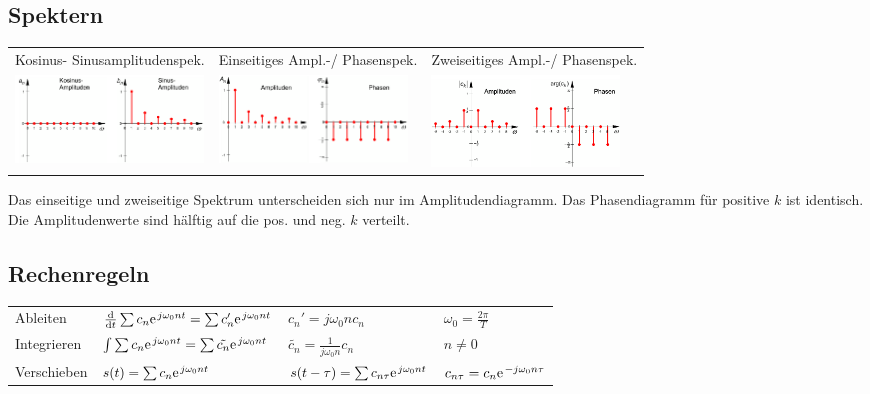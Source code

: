      	
\subsection{Spektern}

\begin{tabular}{p{}p{}p{}}
	Kosinus- Sinusamplitudenspek. & 
	Einseitiges Ampl.-/ Phasenspek. &
	Zweiseitiges Ampl.-/ Phasenspek. \\
	\includegraphics[width=5cm]{content/appendix/cosSinSpectr.png} &
	\includegraphics[width=5cm]{content/appendix/EinseitigSpectr.png} &
	\includegraphics[width=5cm]{content/appendix/ZweiseitigSpectr.png}
\end{tabular}

Das einseitige und zweiseitige Spektrum unterscheiden sich nur im
Amplitudendiagramm. Das Phasendiagramm für positive $k$ ist identisch. Die
Amplitudenwerte sind hälftig auf die pos. und neg. $k$ verteilt.

\subsection{Rechenregeln}
\begin{tabular}{p{}p{}p{}p{}}
  Ableiten & $\frac{\text{d}}{\text{d}t}\sum c_n \e^{j\omega_0 n t}=\sum c_n' \e^{j \omega_0 n t}$ & $c_n'=j\omega_0 n c_n$ & $\omega_0 = \frac{2 \pi}{T}$ \\
  Integrieren & $\int \sum c_n \e^{j\omega_0 n t} = \sum \tilde{c_{n}} \e^{j\omega_0 n t}$ & $\tilde{c_n}=\frac{1}{j\omega_0 n}c_n$ & $n\neq 0$ \\
  Verschieben & $s(t) = \sum c_n \e^{j\omega_0 n t}$ & $s(t-\tau)=\sum c_{n\tau}\e^{j\omega_0 n t}$ & $c_{n\tau}=c_n \e^{-j\omega_0 n \tau}$
\end{tabular}
